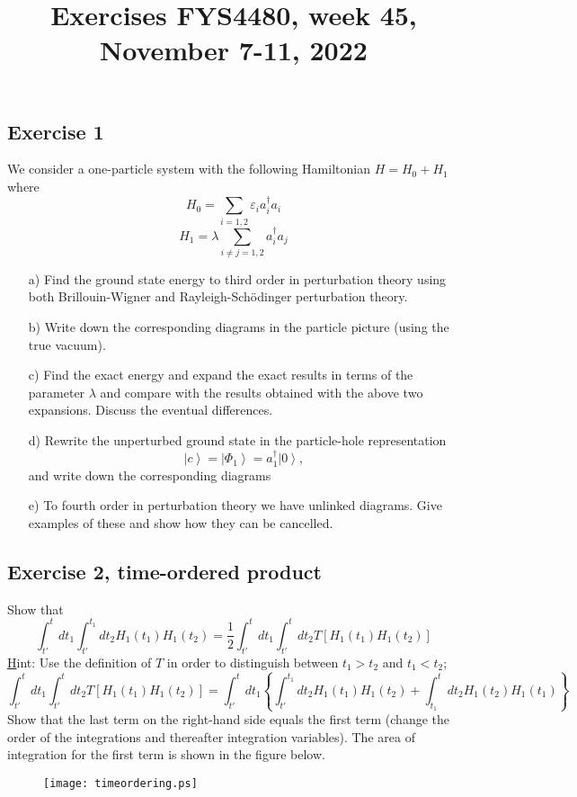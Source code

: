 \documentclass[prc]{revtex4}
\newcommand{\ket}[1]{\left| #1 \right\rangle}
\begin{document}
\title{Exercises FYS4480, week 45, November 7-11, 2022}

\maketitle

\subsection*{Exercise 1}

We consider a one-particle system with the following Hamiltonian
$H=H_{0}+H_{1}$ where
\[
H_{0}=\sum_{i=1,2}\varepsilon_{i}a_{i}^{\dagger}a_{i}
\]
\[
H_{1}=\lambda\sum_{i\neq j=1,2}a_{i}^{\dagger}a_{j}
\]
\begin{enumerate}
\item[a)] Find the ground state energy to third order in perturbation theory
using both Brillouin-Wigner and Rayleigh-Sch\"{o}dinger 
perturbation theory.
\item[b)] Write down the corresponding diagrams in the particle picture (using the true vacuum).
\item[c)] Find the exact energy and expand the exact results in terms of the
parameter $\lambda$ and compare with the results obtained with the above two
expansions. Discuss the eventual differences.
\item[d)] Rewrite the unperturbed ground state in 
the particle-hole representation
\[
\ket{c}=\ket{\Phi_{1}}=a_{1}^{\dagger}\ket{0},
\]
and write down the corresponding diagrams
\item[e)] To fourth order in perturbation theory we have unlinked diagrams.
Give examples of these and show how they can be cancelled.
\end{enumerate}

\subsection*{Exercise 2, time-ordered product}

Show that
\[
{\displaystyle\int_{t'}^{t}}dt_{1}{\displaystyle\int_{t'}
^{t_{1}}}dt_{2}H_{1}(t_{1})H_{1}(t_{2})=
\frac{1}{2}{\displaystyle\int_{t'}^{t}dt_{1}}{\displaystyle
\int_{t'}^{t}}dt_{2}T\left[H_{1}(t_{1})H_{1}(t_{2})\right]
\]
{\underline Hint:} Use the definition of $T$ in order to distinguish between
$t_{1}>t_{2}$ and $t_{1}<t_{2}$;
\[
{\displaystyle\int_{t'}^{t}}dt_{1}{\displaystyle\int_{t'}^{t}}
dt_{2}T\left[H_{1}(t_{1})H_{1}(t_{2})\right]
={\displaystyle\int_{t'}^{t}}dt_{1}\left\{{\displaystyle
\int_{t'}^{t_{1}}}dt_{2}H_{1}(t_{1})H_{1}(t_{2})+{\displaystyle
\int^{t}_{t_{1}}}dt_{2}H_{1}(t_{2})H_{1}(t_{1})
\right\}
\]
Show that the last term on the right-hand side equals the first term
(change the order of the integrations and thereafter integration variables).
The area of integration for the first term is shown in the figure below.
\begin{figure}[hbtp]
\texttt{[image: timeordering.ps]}
\end{figure}
\end{document}
